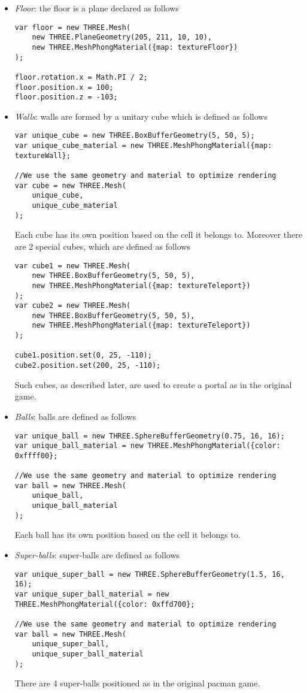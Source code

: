 \documentclass[a4paper,oneside]{report}
\begin{document}
\begin{itemize}
\item \textit{Floor}: the floor is a plane declared as follows
\begin{lstlisting}
var floor = new THREE.Mesh(
	new THREE.PlaneGeometry(205, 211, 10, 10),
	new THREE.MeshPhongMaterial({map: textureFloor})
);

floor.rotation.x = Math.PI / 2;
floor.position.x = 100;
floor.position.z = -103;
\end{lstlisting}

\item \textit{Walls}: walls are formed by a unitary cube which is defined as follows
\begin{lstlisting}
var unique_cube = new THREE.BoxBufferGeometry(5, 50, 5);
var unique_cube_material = new THREE.MeshPhongMaterial({map: textureWall};

//We use the same geometry and material to optimize rendering
var cube = new THREE.Mesh(
	unique_cube,
	unique_cube_material
);

\end{lstlisting}
Each cube has its own position based on the cell it belongs to. Moreover there are 2 special cubes, which are defined as follows
\begin{lstlisting}
var cube1 = new THREE.Mesh(
	new THREE.BoxBufferGeometry(5, 50, 5),
	new THREE.MeshPhongMaterial({map: textureTeleport})
);
var cube2 = new THREE.Mesh(
	new THREE.BoxBufferGeometry(5, 50, 5),
	new THREE.MeshPhongMaterial({map: textureTeleport})
);

cube1.position.set(0, 25, -110);
cube2.position.set(200, 25, -110);
\end{lstlisting}

Such cubes, as described later, are used to create a portal as in the original game.

\item \textit{Balls}: balls are defined as follows
\begin{lstlisting}
var unique_ball = new THREE.SphereBufferGeometry(0.75, 16, 16);
var unique_ball_material = new THREE.MeshPhongMaterial({color: 0xffff00};

//We use the same geometry and material to optimize rendering
var ball = new THREE.Mesh(
	unique_ball,
	unique_ball_material
);
\end{lstlisting}
Each ball has its own position based on the cell it belongs to.
\item \textit{Super-balls}: super-balls are defined as follows
\begin{lstlisting}
var unique_super_ball = new THREE.SphereBufferGeometry(1.5, 16, 16);
var unique_super_ball_material = new THREE.MeshPhongMaterial({color: 0xffd700};

//We use the same geometry and material to optimize rendering
var ball = new THREE.Mesh(
	unique_super_ball,
	unique_super_ball_material
);
\end{lstlisting}
There are 4 super-balls positioned as in the original pacman game.
\end{itemize}
\end{document}
